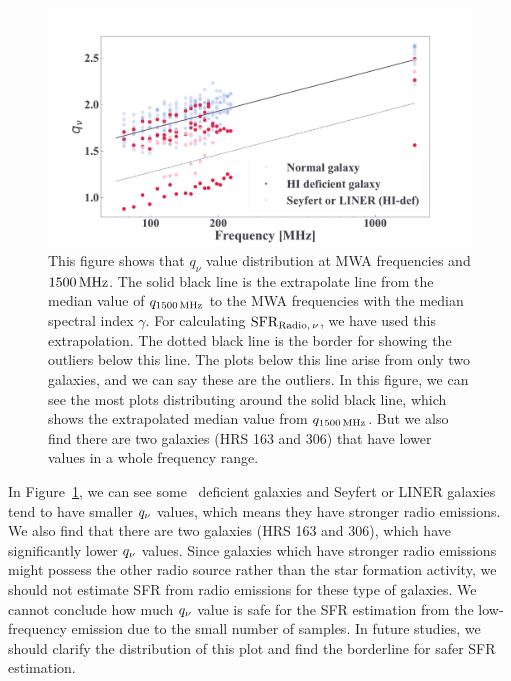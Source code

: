 \begin{figure}[htbp]
	\centering
	\includegraphics[width=\linewidth]{Chapter_6/Figures/Discuss_compareq.pdf}
    \caption[$\qn$ plots for each galaxy with labels]{\label{fig:comparehist_q}
        This figure shows that $q_{\nu}$ value distribution at MWA frequencies and $1500\,\mathrm{MHz}$. The solid black line is the extrapolate line from the median value of $q_{\mathrm{1500\,\mathrm{MHz}}}$ to the MWA frequencies with the median spectral index $\gamma$.
        For calculating $\mathrm{SFR}_{\mathrm{Radio},\,\nu}$, we have used this extrapolation. The dotted black line is the border for showing the outliers below this line.
        The plots below this line arise from only two galaxies, and we can say these are the outliers.
        In this figure, we can see the most plots distributing around the solid black line, which shows the extrapolated median value from $q_{\mathrm{1500\,\mathrm{MHz}}}$.
        But we also find there are two galaxies (HRS 163 and 306) that have lower values in a whole frequency range.
    }
\end{figure}

In Figure~\ref{fig:comparehist_q}, we can see some \nh~deficient galaxies and Seyfert or LINER galaxies tend to have smaller $\qn$ values, which means they have stronger radio emissions.
We also find that there are two galaxies (HRS 163 and 306), which have significantly lower $\qn$ values.
Since galaxies which have stronger radio emissions might possess the other radio source rather than the star formation activity, we should not estimate SFR from radio emissions for these type of galaxies.
We cannot conclude how much $\qn$ value is safe for the SFR estimation from the low-frequency emission due to the small number of samples.
In future studies, we should clarify the distribution of this plot and find the borderline for safer SFR estimation.


